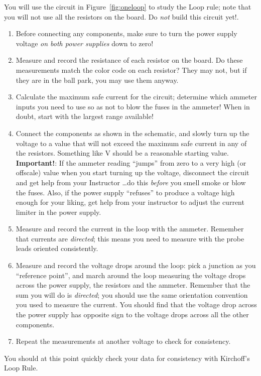 \documentclass[12pt]{article}
\begin{document}
You will use the circuit in Figure~\ref{fig:oneloop} to study the Loop
rule; note that you will not use all the resistors on the board.  Do
\textit{not} build this circuit yet!.
\begin{enumerate}
\item Before connecting any components, make sure to turn the power
  supply voltage \textit{on both power supplies} down to zero!
\item Measure and record the resistance of each resistor on the
  board.  Do these measurements match the color code on each resistor?
  They may not, but if they are in the ball park, you may use them
  anyway. 
\item Calculate the maximum safe current for the circuit; determine
  which ammeter inputs you need to use so as not to blow the fuses in
  the ammeter!  When in doubt, start with the largest range available! 
\item Connect the components as shown in the schematic, and slowly
  turn up the voltage to a value that will not exceed the maximum safe
  current in any of the resistors.  Something like \unit[15]{V} should
  be a reasonable starting value.  \textbf{Important!}: If the ammeter
  reading ``jumps'' from zero to a very high (or offscale) value when
  you start turning up the voltage, disconnect the circuit and get
  help from your Instructor \ldots do this \textit{before} you smell
  smoke or blow the fuses.  Also, if the power supply ``refuses'' to
  produce a voltage high enough for your liking, get help from your
  instructor to adjust the current limiter in the power supply.
\item Measure and record the current in the loop with the ammeter.
  Remember that currents are \textit{directed}; this means you need to
  measure with the probe leads oriented consistently.
\item Measure and record the voltage drops around the loop: pick a
  junction as you ``reference point'', and march around the loop
  measuring the voltage drops across the power supply, the resistors
  and the ammeter.  Remember that the sum you will do is
  \textit{directed}; you should use the same orientation convention
  you used to measure the current.  You should find that the voltage
  drop across the power supply has opposite sign to the voltage drops
  across all the other components.
\item Repeat the measurements at another voltage to check for
  consistency.
\end{enumerate}
You should at this point quickly check your data for consistency with
Kirchoff's Loop Rule.
\end{document}
